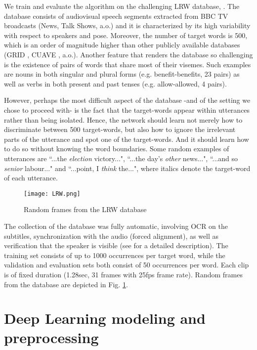 \documentclass[a4paper]{article}
\begin{document}
We train and evaluate the algorithm on the challenging LRW database, \cite{chung2016lip}. The database consists of audiovisual speech segments extracted from BBC TV broadcasts (News, Talk Shows, a.o.) and it is characterized by its high variability with respect to speakers and pose. Moreover, the number of target words is 500, which is an order of magnitude higher than other publicly available databases (GRID \cite{GRID}, CUAVE \cite{CUAVE}, a.o.). Another feature that renders the database so challenging is the existence of pairs of words that share most of their visemes. Such examples are nouns in both singular and plural forms (e.g. benefit-benefits, 23 pairs) as well as verbs in both present and past tenses (e.g. allow-allowed, 4 pairs). 

However, perhaps the most difficult aspect of the database -and of the setting we chose to proceed with- is the fact that the target-words appear within utterances rather than being isolated. Hence, the network should learn not merely how to discriminate between 500 target-words, but also how to ignore the irrelevant parts of the utterance and spot one of the target-words. And it should learn how to do so without knowing the word boundaries. Some random examples of utterances are ``...the {\em election} victory...", ``...the day's {\em other} news...", ``...and so {\em senior} labour..."  and ``...point, I {\em think} the...", where italics denote the target-word of each utterance.

\begin{figure}
\centering
\texttt{[image: LRW.png]}
\vspace{-1mm}\caption{Random frames from the LRW database}
\label{LRW}
\end{figure}

The collection of the database was fully automatic, involving OCR on the subtitles, synchronization with the audio (forced alignment), as well as verification that the speaker is visible (see \cite{chung2016lip} for a detailed description). The training set consists of up to 1000 occurrences per target word, while the validation and evaluation sets both consist of 50 occurrences per word. Each clip is of fixed duration (1.28sec, 31 frames with 25fps frame rate). Random frames from the database are depicted in Fig. \ref{LRW}. 

\section{Deep Learning modeling and preprocessing}
\label{Our_Model}
\end{document}
